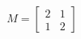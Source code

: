 \documentclass[preview]{standalone}
\begin{document}
\begin{align*}
M = \begin{bmatrix} 2 & 1 \\ 1 & 2 \end{bmatrix}
\end{align*}
\end{document}
